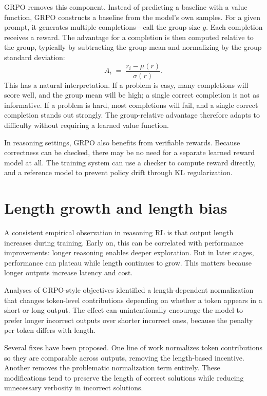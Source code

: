 GRPO removes this component. Instead of predicting a baseline with a value function, GRPO constructs a baseline from the model’s own samples. For a given prompt, it generates multiple completions—call the group size \(g\). Each completion receives a reward. The advantage for a completion is then computed relative to the group, typically by subtracting the group mean and normalizing by the group standard deviation:
\[
A_i \;=\; \frac{r_i - \mu(r)}{\sigma(r)}.
\]
This has a natural interpretation. If a problem is easy, many completions will score well, and the group mean will be high; a single correct completion is not as informative. If a problem is hard, most completions will fail, and a single correct completion stands out strongly. The group-relative advantage therefore adapts to difficulty without requiring a learned value function.

In reasoning settings, GRPO also benefits from verifiable rewards. Because correctness can be checked, there may be no need for a separate learned reward model at all. The training system can use a checker to compute reward directly, and a reference model to prevent policy drift through KL regularization.

\section{Length growth and length bias}
A consistent empirical observation in reasoning RL is that output length increases during training. Early on, this can be correlated with performance improvements: longer reasoning enables deeper exploration. But in later stages, performance can plateau while length continues to grow. This matters because longer outputs increase latency and cost.

Analyses of GRPO-style objectives identified a length-dependent normalization that changes token-level contributions depending on whether a token appears in a short or long output. The effect can unintentionally encourage the model to prefer longer incorrect outputs over shorter incorrect ones, because the penalty per token differs with length.

Several fixes have been proposed. One line of work normalizes token contributions so they are comparable across outputs, removing the length-based incentive. Another removes the problematic normalization term entirely. These modifications tend to preserve the length of correct solutions while reducing unnecessary verbosity in incorrect solutions.

